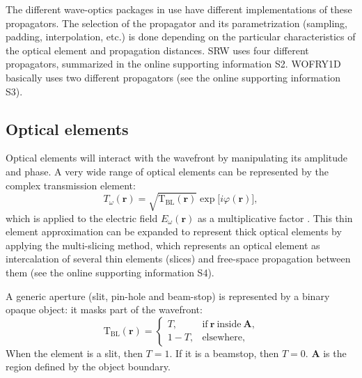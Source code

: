 \documentclass[preprint]{iucr}
\newcommand{\inred}[1]{{\color{red}#1}}
\begin{document}
The different wave-optics packages in use have different implementation\inred{s} of these propagators. The selection of the propagator and its parametrization (sampling, padding, interpolation, etc.) is done depending on the particular characteristics of the optical element and propagation distances. SRW uses four different propagators, summarized in the \inred{online supporting information S2}. WOFRY1D basically uses two different propagators (see \inred{the online supporting information S3}).   

\subsection{Optical elements}\label{sec:OE}

Optical elements will interact with the wavefront by manipulating its amplitude and phase. A very wide range of optical elements can be represented by the complex transmission element:
 \begin{equation}\label{eq:trans_el}
T_\omega(\textbf{r})=\sqrt{\mathrm{T}_\mathrm{BL}(\textbf{r})}\exp{\big[ i\varphi(\textbf{r})\big]},
\end{equation}
which is applied to the electric field $E_\omega(\textbf{r})$ as a multiplicative factor \cite{Cloetens_1996}. This thin element approximation can be expanded to represent thick optical elements by applying the multi-slicing method, \inred{which} represents an optical element as intercalation of several thin elements (slices) and free-space propagation between them \cite{paganin_book, Li2017, Munro2019} (see \inred{the online supporting information S4}). 

A generic aperture (slit, pin-hole and beam-stop) is represented by a binary opaque object: it masks part of the wavefront:
\begin{equation}\label{eq:slit}
    \mathrm{T}_{\text{BL}}(\textbf{r}) = 
        \begin{cases}
      T, & \text{if}~\textbf{r}~\text{inside}~\textbf{A},\\
      1-T, &\text{elsewhere},
        \end{cases}
\end{equation}
When the element is a slit, then $T=1$. If it is a beamstop, then $T=0$. $\textbf{A}$ is the region defined by the object boundary. 
\end{document}
